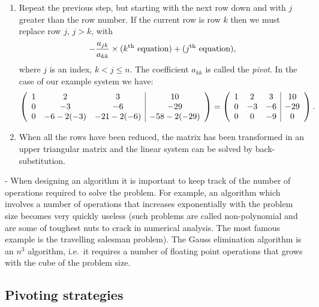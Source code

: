 \begin{enumerate}
\item Repeat the previous step, but starting with the next row down
and with $j$ greater than the row number.   If the current row is row
$k$ then we must replace row $j$, $j > k$, with
%
%
\begin{equation*}
   -\frac{a_{j k}}{a_{k k}} \times ( k^{\rm th} \text{ equation} ) +
   ( j^{\rm th}\text{ equation} ) ,
 \end{equation*}
%
where $j$ is an index, $k < j \le n$.    The coefficient $a_{k k}$ is
called the \textit{pivot}. In the case of our example system we have:
%
\begin{equation*}
  \left (
  \begin{array}{c c c|c}
   1 & 2 & 3 & 10 \\
   0 & -3 & -6 & -29 \\
   0 & -6 - 2 (-3) & -21 - 2 (-6) & -58 - 2 (-29)
  \end{array}
 \right ) =
 \left (
  \begin{array}{c c c|c}
   1 & 2 & 3 & 10 \\
   0 & -3 & -6 & -29 \\
   0 & 0 & -9 & 0
  \end{array}
 \right ) .
\end{equation*}


\item When all the rows have been reduced, the matrix has been
transformed in an upper triangular matrix and the linear system can be
solved by back-substitution.

\end{enumerate}

 - When designing an algorithm it is important
to keep track of the number of operations required to solve the
problem.   For example, an algorithm which involves a number of
operations that increases exponentially with the problem size becomes
very quickly useless (such problems are called non-polynomial and are
some of toughest nuts to crack in numerical analysis.  The most famous
example is the travelling salesman problem).    The Gauss elimination
algorithm is an $n^3$ algorithm, i.e.\ it requires a number of floating
point operations that grows with the cube of the problem size.

\subsection{Pivoting strategies}

